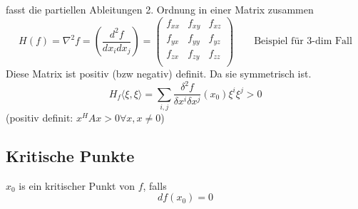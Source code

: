 \documentclass[a4paper]{article}
\begin{document}
		\begin{fdef}
			fasst die partiellen Ableitungen 2. Ordnung in einer Matrix zusammen
				\vspace{-2.5mm}
			$$H(f) = \nabla^2 f = \left ( \frac{d^2 f}{d x_i d x_j} \right ) =
				\begin{pmatrix}
					f_{xx}    &   f_{xy}    &   f_{xz}\\
					f_{yx}    &   f_{yy}    &   f_{yz}\\
					f_{zx}    &   f_{zy}    &   f_{zz}\\
				\end{pmatrix}   \qquad \text{Beispiel für 3-dim Fall}$$
			Diese Matrix ist positiv (bzw negativ) definit. Da sie symmetrisch ist. 
			$$H_f \langle \xi, \xi \rangle = \sum_{i,j}  \frac{\delta ^2 f}{\delta x^i \delta x^j}(x_0)\xi^i \xi^j > 0$$
			(positiv definit: $x^H A x > 0 \forall x, x \neq 0$)
		\end{fdef}
		
	\newpage
	\subsection{Kritische Punkte}
		
		\begin{fdef}
			$x_0$ is ein kritischer Punkt von $f$, falls $$df(x_0) = 0$$
		\end{fdef}
\end{document}
